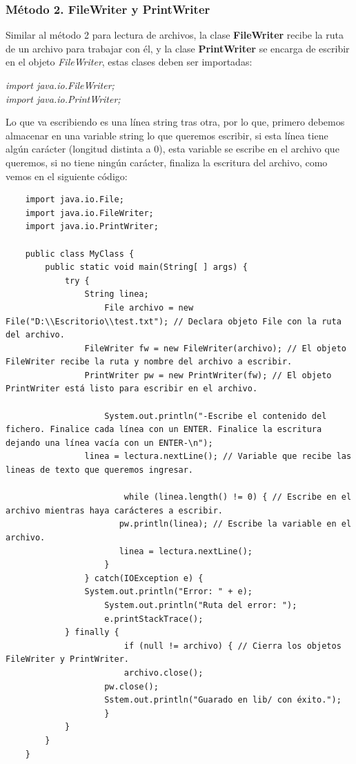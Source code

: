 \subsubsection{Método 2. FileWriter y PrintWriter}
\hspace{0.55cm}Similar al método 2 para lectura de archivos, la clase \textbf{FileWriter} recibe la ruta de un archivo para trabajar con él, y la clase \textbf{PrintWriter} se encarga de escribir en el objeto \textit{FileWriter}, estas clases deben ser importadas:
\begin{center}
	\textit{
		import java.io.FileWriter; \\
		import java.io.PrintWriter;
	}
\end{center}

Lo que va escribiendo es una línea string tras otra, por lo que, primero debemos almacenar en una variable string lo que queremos escribir, si esta línea tiene algún carácter (longitud distinta a 0), esta variable se escribe en el archivo que queremos, si no tiene ningún carácter, finaliza la escritura del archivo, como vemos en el siguiente código:
\begin{lstlisting}
	import java.io.File;
	import java.io.FileWriter;
	import java.io.PrintWriter;

	public class MyClass {
		public static void main(String[ ] args) {
			try {
				String linea;
		        	File archivo = new File("D:\\Escritorio\\test.txt"); // Declara objeto File con la ruta del archivo.
				FileWriter fw = new FileWriter(archivo); // El objeto FileWriter recibe la ruta y nombre del archivo a escribir.
				PrintWriter pw = new PrintWriter(fw); // El objeto PrintWriter está listo para escribir en el archivo.
        
        			System.out.println("-Escribe el contenido del fichero. Finalice cada línea con un ENTER. Finalice la escritura dejando una línea vacía con un ENTER-\n");
				linea = lectura.nextLine(); // Variable que recibe las lineas de texto que queremos ingresar.

    		        	while (linea.length() != 0) { // Escribe en el archivo mientras haya carácteres a escribir.
         	    	   pw.println(linea); // Escribe la variable en el archivo.
             		   linea = lectura.nextLine();
	            	}
    		    } catch(IOException e) {
         	   	System.out.println("Error: " + e);
            		System.out.println("Ruta del error: ");
            		e.printStackTrace();
	        } finally {
    		        	if (null != archivo) { // Cierra los objetos FileWriter y PrintWriter.
         	    	    archivo.close();
             		pw.close();
             		Sstem.out.println("Guarado en lib/ con éxito.");
	        		}
	        }
	    }
	}
\end{lstlisting}

